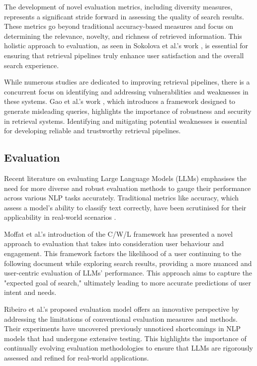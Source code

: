 The development of novel evaluation metrics, including diversity measures, represents a significant stride forward in assessing the quality of search results. These metrics go beyond traditional accuracy-based measures and focus on determining the relevance, novelty, and richness of retrieved information. This holistic approach to evaluation, as seen in Sokolova et al.'s work \cite{sokolova}, is essential for ensuring that retrieval pipelines truly enhance user satisfaction and the overall search experience.

While numerous studies are dedicated to improving retrieval pipelines, there is a concurrent focus on identifying and addressing vulnerabilities and weaknesses in these systems. Gao et al.'s work \cite{gao}, which introduces a framework designed to generate misleading queries, highlights the importance of robustness and security in retrieval systems. Identifying and mitigating potential weaknesses is essential for developing reliable and trustworthy retrieval pipelines.

\subsection{Evaluation}
Recent literature on evaluating Large Language Models (LLMs) emphasises the need for more diverse and robust evaluation methods to gauge their performance across various NLP tasks accurately. Traditional metrics like accuracy, which assess a model's ability to classify text correctly, have been scrutinised for their applicability in real-world scenarios \cite{sokolova, ribeiro}.

Moffat et al.'s introduction of the C/W/L framework \cite{moffat} has presented a novel approach to evaluation that takes into consideration user behaviour and engagement. This framework factors the likelihood of a user continuing to the following document while exploring search results, providing a more nuanced and user-centric evaluation of LLMs' performance. This approach aims to capture the "expected goal of search," ultimately leading to more accurate predictions of user intent and needs.

Ribeiro et al.'s proposed evaluation model \cite{ribeiro} offers an innovative perspective by addressing the limitations of conventional evaluation measures and methods. Their experiments have uncovered previously unnoticed shortcomings in NLP models that had undergone extensive testing. This highlights the importance of continually evolving evaluation methodologies to ensure that LLMs are rigorously assessed and refined for real-world applications.